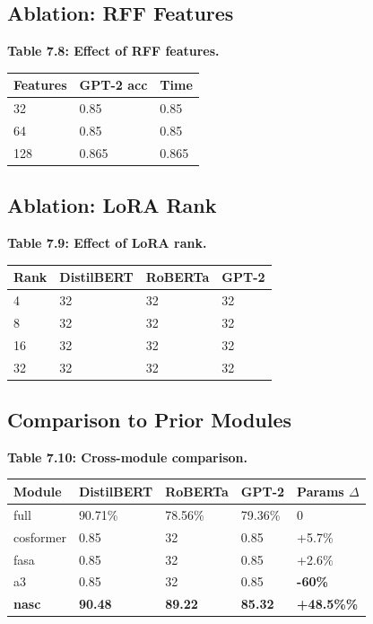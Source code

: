 \subsection{Ablation: RFF Features}

\textbf{Table 7.8: Effect of RFF features.}

\begin{table}[H]
\centering
\small
\begin{tabular}{lll}
\toprule
\textbf{Features} & \textbf{GPT-2 acc} & \textbf{Time} \\
\midrule
32 & 0.85 & 0.85 \\
64 & 0.85 & 0.85 \\
128 & 0.865 & 0.865 \\
\bottomrule
\end{tabular}
\end{table}

\subsection{Ablation: LoRA Rank}

\textbf{Table 7.9: Effect of LoRA rank.}

\begin{table}[H]
\centering
\small
\begin{tabular}{llll}
\toprule
\textbf{Rank} & \textbf{DistilBERT} & \textbf{RoBERTa} & \textbf{GPT-2} \\
\midrule
4 & 32 & 32 & 32 \\
8 & 32 & 32 & 32 \\
16 & 32 & 32 & 32 \\
32 & 32 & 32 & 32 \\
\bottomrule
\end{tabular}
\end{table}

\subsection{Comparison to Prior Modules}

\textbf{Table 7.10: Cross-module comparison.}

\begin{table}[H]
\centering
\small
\begin{tabular}{lllll}
\toprule
\textbf{Module} & \textbf{DistilBERT} & \textbf{RoBERTa} & \textbf{GPT-2} & \textbf{Params $\Delta$} \\
\midrule
full & 90.71\% & 78.56\% & 79.36\% & 0 \\
cosformer & 0.85 & 32 & 0.85 & +5.7\% \\
fasa & 0.85 & 32 & 0.85 & +2.6\% \\
a3 & 0.85 & 32 & 0.85 & \textbf{-60\%} \\
\textbf{nasc} & \textbf{90.48} & \textbf{89.22} & \textbf{85.32} & \textbf{+48.5\%\%} \\
\bottomrule
\end{tabular}
\end{table}

